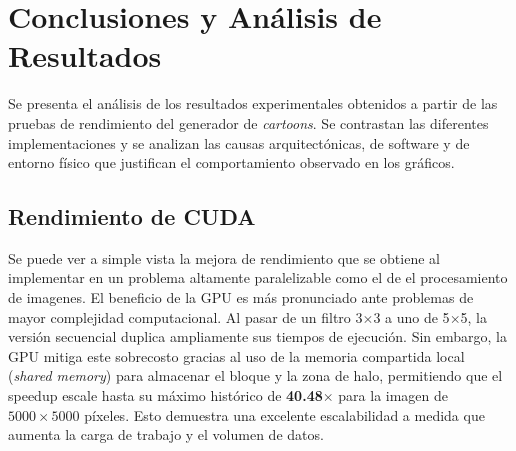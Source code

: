 \chapter{Conclusiones y Análisis de Resultados}

Se presenta el análisis de los resultados experimentales obtenidos a partir de las pruebas de rendimiento del generador de \textit{cartoons}. Se contrastan las diferentes implementaciones y se analizan las causas arquitectónicas, de software y de entorno físico que justifican el comportamiento observado en los gráficos.

\section{Rendimiento de CUDA}

Se puede ver a simple vista la mejora de rendimiento que se obtiene al implementar en un problema altamente paralelizable como el de el procesamiento de imagenes. El beneficio de la GPU es más pronunciado ante problemas de mayor complejidad computacional. Al pasar de un filtro 3$\times$3 a uno de 5$\times$5, la versión secuencial duplica ampliamente sus tiempos de ejecución. Sin embargo, la GPU mitiga este sobrecosto gracias al uso de la memoria compartida local (\textit{shared memory}) para almacenar el bloque y la zona de halo, permitiendo que el speedup escale hasta su máximo histórico de \textbf{40.48$\times$} para la imagen de $5000\times5000$ píxeles. Esto demuestra una excelente escalabilidad a medida que aumenta la carga de trabajo y el volumen de datos.
